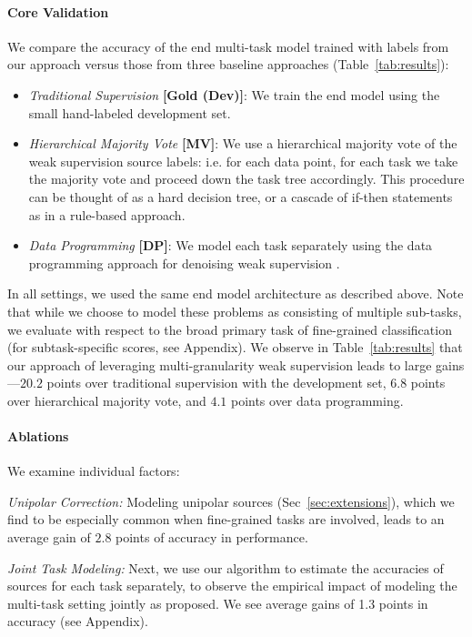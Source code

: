\documentclass[letterpaper]{article}
\newcommand{\AvgGainOverGold}[0]{20.2}
\newcommand{\AvgGainOverMV}[0]{6.8}
\newcommand{\AvgGainOverDP}[0]{4.1}
\newcommand{\AvgUnipolarBoost}[0]{2.8}
\begin{document}
\paragraph*{Core Validation}
We compare the accuracy of the end multi-task model trained with labels from our approach versus those from three baseline approaches (Table~\ref{tab:results}):
\begin{itemize}
  \item \textit{Traditional Supervision} \textbf{[Gold (Dev)]}:
  We train the end model using the small hand-labeled development set.
  
  \item \textit{Hierarchical Majority Vote} \textbf{[MV]}:
  We use a hierarchical majority vote of the weak supervision source labels: i.e. for each data point, for each task we take the majority vote and proceed down the task tree accordingly.
  This procedure can be thought of as a hard decision tree, or a cascade of if-then statements as in a rule-based approach.

  \item \textit{Data Programming} \textbf{[DP]}:
  We model each task separately using the data programming approach for denoising weak supervision \cite{ratner2018snorkel}.
\end{itemize}
In all settings, we used the same end model architecture as described above.
Note that while we choose to model these problems as consisting of multiple sub-tasks, we evaluate with respect to the broad primary task of fine-grained classification (for subtask-specific scores, see Appendix).
We observe in Table~\ref{tab:results} that our approach of leveraging multi-granularity weak supervision leads to large gains---$\AvgGainOverGold$ points over traditional supervision with the development set, $\AvgGainOverMV$ points over hierarchical majority vote, and $\AvgGainOverDP$ points over data programming.

\paragraph*{Ablations}
We examine individual factors:

\textit{Unipolar Correction:}
Modeling unipolar sources (Sec~\ref{sec:extensions}), which we find to be especially common when fine-grained tasks are involved, leads to an average gain of $\AvgUnipolarBoost$ points of accuracy in \systemx performance.

\textit{Joint Task Modeling:}
Next, we use our algorithm to estimate the accuracies of sources for each task separately, to observe the empirical impact of modeling the multi-task setting jointly as proposed.
We see average gains of 1.3 points in accuracy (see Appendix).
\end{document}
